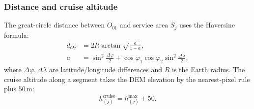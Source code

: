 \documentclass[journal]{IEEEtran}
\begin{document}
\subsubsection{Distance and cruise altitude}
The great-circle distance between $O_{01}$ and service area $S_j$ uses the
Haversine formula:
\begin{equation}
\begin{aligned}
d_{Oj}&=2R\arctan\!\sqrt{\frac{a}{1-a}},\\
a&=\sin^{2}\!\frac{\Delta\varphi}{2}
+\cos\varphi_{1}\cos\varphi_{2}\sin^{2}\!\frac{\Delta\lambda}{2},
\end{aligned}
\end{equation}
where $\Delta\varphi,\Delta\lambda$ are latitude/longitude differences and $R$ is
the Earth radius. The cruise altitude along a segment takes the DEM elevation by
the nearest-pixel rule plus 50\,m:
\begin{equation}
h^{\mathrm{cruise}}_{(j)}=h^{\max}_{(j)}+50 .
\end{equation}
\end{document}

